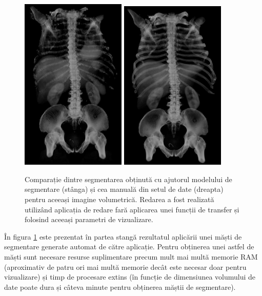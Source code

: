 \begin{figure}[!htb]
    \centering
    \includegraphics[width=5cm]{images/seg_comp.jpg}
    \includegraphics[width=5cm]{images/seg_labels.jpg}
    \\
    \caption{Comparație dintre segmentarea obținută cu ajutorul modelului de segmentare (stânga) și cea manuală din setul de date (dreapta) pentru aceeași imagine volumetrică. Redarea a fost realizată utilizând aplicația de redare fară aplicarea unei funcții de transfer și folosind aceeași parametri de vizualizare.}
    \label{fig:viz_seg_comp}
\end{figure}

În figura \ref{fig:viz_seg_comp} este prezentat în partea stangă rezultatul aplicării unei măști de segmentare generate automat de către aplicație. Pentru obținerea unei astfel de măști sunt necesare resurse suplimentare precum mult mai multă memorie RAM (aproximativ de patru ori mai multă memorie decât este necesar doar pentru vizualizare) și timp de procesare extins (în funcție de dimensiunea volumului de date poate dura și câteva minute pentru obținerea măștii de segmentare).


